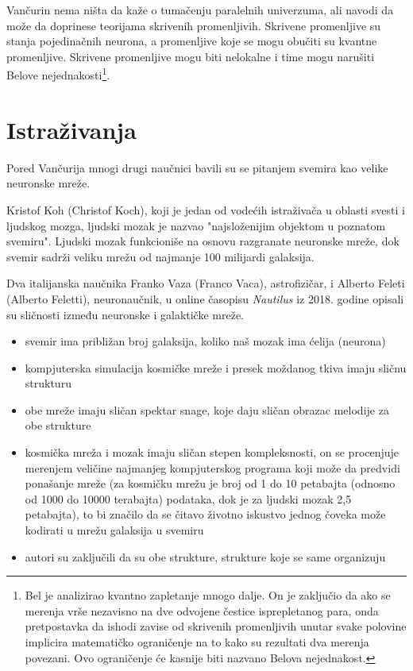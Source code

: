 \documentclass[a4paper]{article}
\begin{document}
Vančurin nema ništa da kaže o tumačenju paralelnih univerzuma, ali navodi da može da doprinese teorijama skrivenih promenljivih. Skrivene promenljive su stanja pojedinačnih neurona, a promenljive koje se mogu obučiti su kvantne promenljive. Skrivene promenljive mogu biti nelokalne i time mogu narušiti Belove nejednakosti\footnote{ Bel je analizirao kvantno zapletanje mnogo dalje. On je zaključio da ako se merenja vrše nezavisno na dve odvojene čestice isprepletanog para, onda pretpostavka da ishodi zavise od skrivenih promenljivih unutar svake polovine implicira matematičko ograničenje na to kako su rezultati dva merenja povezani. Ovo ograničenje će kasnije biti nazvano Belova nejednakost.}.


\section{Istraživanja}
Pored Vančurija mnogi drugi naučnici bavili su se pitanjem svemira kao velike neuronske mreže. 

Kristof Koh (Christof Koch), koji je jedan od vodećih istraživača u oblasti svesti i ljudskog mozga, ljudski mozak je nazvao "najsloženijim objektom u poznatom svemiru". Ljudski mozak funkcioniše na osnovu razgranate neuronske mreže, dok svemir sadrži veliku mrežu od najmanje 100 milijardi galaksija. 

Dva italijanska naučnika Franko Vaza (Franco Vaca), astrofizičar, i Alberto Feleti (Alberto Feletti), neuronaučnik, u online časopisu \textit{Nautilus} iz 2018. godine opisali su sličnosti između neuronske i galaktičke mreže. 
\begin{itemize}
  \item svemir ima približan broj galaksija, koliko naš mozak ima ćelija (neurona) 
  \item kompjuterska simulacija kosmičke mreže i presek moždanog tkiva imaju sličnu strukturu 
  \item obe mreže imaju sličan spektar snage, koje daju sličan obrazac melodije za obe strukture 
  \item kosmička mreža i mozak imaju sličan stepen kompleksnosti, on se procenjuje merenjem veličine najmanjeg kompjuterskog programa koji može da predvidi ponašanje mreže (za kosmičku mrežu je broj od 1 do 10 petabajta (odnosno od 1000 do 10000 terabajta) podataka, dok je za ljudski mozak 2,5 petabajta), to bi značilo da se čitavo životno iskustvo jednog čoveka može kodirati u mrežu galaksija u svemiru
  \item autori su zaključili da su obe strukture, strukture koje se same organizuju
\end{itemize}
\end{document}
